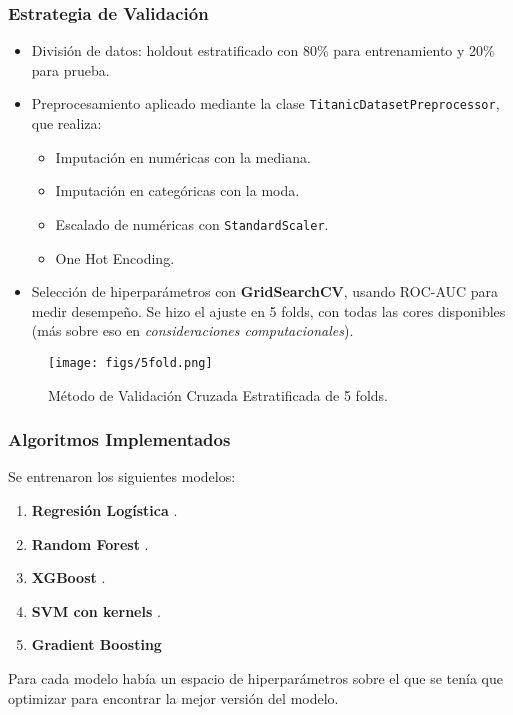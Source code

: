 \documentclass[conference]{IEEEtran}
\begin{document}
\subsubsection{Estrategia de Validación}
\label{sec:org06d83d2}
\begin{itemize}
\item División de datos: holdout estratificado con 80\% para entrenamiento y 20\% para prueba.
\item Preprocesamiento aplicado mediante la clase \texttt{TitanicDatasetPreprocessor}, que realiza:  
\begin{itemize}
\item Imputación en numéricas con la mediana.
\item Imputación en categóricas con la moda.
\item Escalado de numéricas con \texttt{StandardScaler}.
\item One Hot Encoding.
\end{itemize}
\item Selección de hiperparámetros con \textbf{GridSearchCV}, usando ROC-AUC para medir desempeño. Se
hizo el ajuste en 5 folds, con todas las cores disponibles (más sobre eso en
\emph{consideraciones computacionales}).
\end{itemize}

\begin{figure}[h!]
\texttt{[image: figs/5fold.png]}
\centering
\caption{Método de Validación Cruzada Estratificada de 5 folds.}
\label{fig:5-fold}
\end{figure}
\subsubsection{Algoritmos Implementados}
\label{sec:org8c33b42}
Se entrenaron los siguientes modelos:

\begin{enumerate}
\item \textbf{Regresión Logística} \autocite{mccullagh1989glm} \autocite{defazio2014saga}.
\item \textbf{Random Forest} \autocite{breiman2001randomforest}.
\item \textbf{XGBoost} \autocite{chen2016xgboost}.
\item \textbf{SVM con kernels} \autocite{cortes1995svm}.
\item \textbf{Gradient Boosting} \autocite{friedman2001gbm}
\end{enumerate}

Para cada modelo había un espacio de hiperparámetros sobre el que se
tenía que optimizar para encontrar la mejor versión del modelo.
\end{document}
